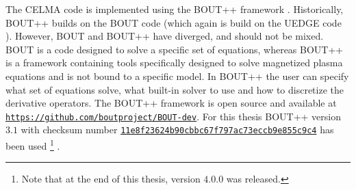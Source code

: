 \label{chap:BOUT++}
The CELMA code is implemented using the BOUT++ framework \cite{Dudson2009,Dudson2014a,Dudson2016}.
Historically, BOUT++ builds on the BOUT code \cite{Xu1998} (which again is build on the UEDGE code \cite{Rognlien1996}).
However, BOUT and BOUT++ have diverged, and should not be mixed.
BOUT is a code designed to solve a specific set of equations, whereas BOUT++ is a framework containing tools specifically designed to solve magnetized plasma equations and is not bound to a specific model.
In BOUT++ the user can specify what set of equations solve, what built-in solver to use and how to discretize the derivative operators.
The BOUT++ framework is open source and available at \href{https://github.com/boutproject/BOUT-dev}{\texttt{https://github.com/boutproject/BOUT-dev}}.
For this thesis BOUT++ version $3.1$ with checksum number \href{https://github.com/boutproject/BOUT-dev/releases/tag/v3.1}{\texttt{11e8f23624b90cbbc67f797ac73eccb9e855c9c4}} has been used%
%
\footnote{Note that at the end of this thesis, version $4.0.0$ was released.}%
%
.

